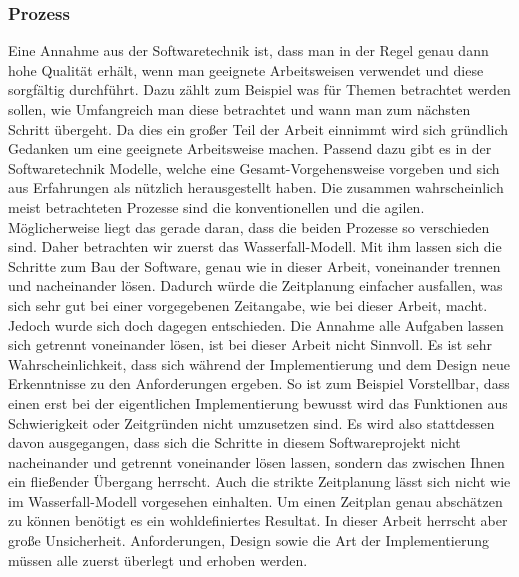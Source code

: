 \subsubsection{Prozess} \myCheckmark
Eine Annahme aus der Softwaretechnik ist, \glqq dass man in der Regel genau dann hohe Qualität erhält, wenn man geeignete Arbeitsweisen verwendet und diese sorgfältig durchführt\grqq. Dazu zählt zum Beispiel was für Themen betrachtet werden sollen, wie Umfangreich man diese betrachtet und wann man zum nächsten Schritt übergeht. 
	Da dies ein großer Teil der Arbeit einnimmt wird sich gründlich Gedanken um eine geeignete Arbeitsweise machen.\newline%
Passend dazu gibt es in der Softwaretechnik Modelle, welche eine Gesamt-Vorgehensweise vorgeben und sich aus Erfahrungen als nützlich herausgestellt haben.\newline%
Die zusammen wahrscheinlich meist betrachteten Prozesse sind die konventionellen und die agilen. Möglicherweise liegt das gerade daran, dass die beiden Prozesse so verschieden sind.\newline%
	Daher betrachten wir zuerst das Wasserfall-Modell. 
		Mit ihm lassen sich die Schritte zum Bau der Software, genau wie in dieser Arbeit, voneinander trennen und nacheinander lösen. Dadurch würde die Zeitplanung einfacher ausfallen, was sich sehr gut bei einer vorgegebenen Zeitangabe, wie bei dieser Arbeit, macht.\newline%
		Jedoch wurde sich doch dagegen entschieden. Die Annahme \glqq alle Aufgaben lassen sich getrennt voneinander lösen\grqq, ist bei dieser Arbeit nicht Sinnvoll. Es ist sehr Wahrscheinlichkeit, dass sich während der Implementierung und dem Design neue Erkenntnisse zu den Anforderungen ergeben. So ist zum Beispiel Vorstellbar, dass  einen erst bei der eigentlichen Implementierung bewusst wird das Funktionen aus Schwierigkeit oder Zeitgründen nicht umzusetzen sind.\newline%
			Es wird also stattdessen davon ausgegangen, dass sich die Schritte in diesem Softwareprojekt nicht nacheinander und getrennt voneinander lösen lassen, sondern das zwischen Ihnen ein fließender Übergang herrscht.\newline%
		Auch die strikte Zeitplanung lässt sich nicht wie im Wasserfall-Modell vorgesehen einhalten. Um einen Zeitplan genau abschätzen zu können benötigt es ein wohldefiniertes Resultat. In dieser Arbeit herrscht aber große Unsicherheit. Anforderungen, Design sowie die Art der Implementierung müssen alle zuerst überlegt und erhoben werden.\newline%

